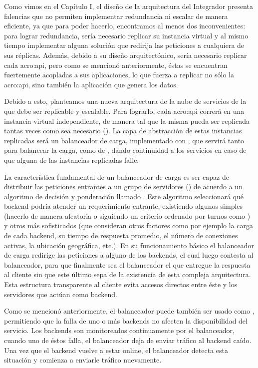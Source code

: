 Como vimos en el Capítulo I, el diseño de la arquitectura del Integrador presenta falencias que no permiten implementar redundancia ni escalar de manera eficiente, ya que para poder hacerlo, encontramos al menos dos inconvenientes: para lograr redundancia, sería necesario replicar su instancia virtual y al mismo tiempo implementar alguna solución que redirija las peticiones a cualquiera de sus réplicas.  Además, debido a su diseño arquitectónico, sería necesario replicar cada \gls{acro:api}, pero como se mencionó anteriormente, éstas se encuentran fuertemente acopladas a sus aplicaciones, lo que fuerza a replicar no sólo la \gls{acro:api}, sino también la aplicación que genera los datos.

Debido a esto, planteamos una nueva arquitectura de la nube de servicios de la {\unlp} que debe ser replicable y escalable. Para lograrlo, cada \gls{acro:api} correrá en una instancia virtual independiente, de manera tal que la misma pueda ser replicada tantas veces como sea necesario (). La capa de abstracción de estas instancias replicadas será un balanceador de carga, implementado con , que servirá tanto para balancear la carga, como de , dando continuidad a los servicios en caso de que alguna de las instancias replicadas falle.

La característica fundamental de un balanceador de carga es ser capaz de distribuir las peticiones entrantes a un grupo de servidores () de acuerdo a un algoritmo de decisión y ponderación llamado . Este algoritmo seleccionará qué backend podría atender un requerimiento entrante, existiendo algunos simples (hacerlo de manera aleatoria o siguiendo un criterio ordenado por turnos como ) y otros más sofisticados (que consideran otros factores como por ejemplo la carga de cada backend, su tiempo de respuesta promedio, el número de conexiones activas, la ubicación geográfica, etc.). En su funcionamiento básico el balanceador de carga redirige las peticiones a alguno de los backends, el cual luego contesta al balanceador, para que finalmente sea el balanceador el que entregue la respuesta al cliente sin que este último sepa de la existencia de esta compleja arquitectura. Esta estructura transparente al cliente evita accesos directos entre éste y los servidores que actúan como backend.

Como se mencionó anteriormente, el balanceador puede también ser usado como , permitiendo que la falla de uno o más backends no afecten la disponibilidad del servicio. Los backends son monitoreados continuamente por el balanceador, cuando uno de éstos falla, el balanceador deja de enviar tráfico al backend caído. Una vez que el backend vuelve a estar online, el balanceador detecta esta situación y comienza a enviarle tráfico nuevamente.

